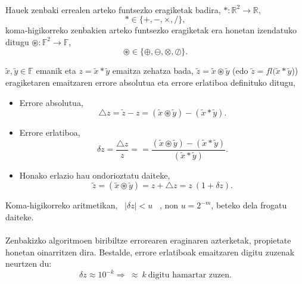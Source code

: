 \paragraph*{} Hauek zenbaki errealen arteko funtsezko eragiketak badira,  $\ast: \mathbb{R}^2\rightarrow \mathbb{R}$, 
\begin{equation*}
\ast\in \{+,-,\times,/ \},
\end{equation*}
koma-higikorreko zenbakien arteko funtsezko eragiketak era honetan izendatuko ditugu  $\circledast: \mathbb{F}^2\rightarrow \mathbb{F}$,
\begin{equation*}
\circledast\in \{\oplus,\ominus,\otimes,\oslash \}.
\end{equation*}

$\tilde x,\tilde y \in \mathbb{F}$ emanik eta $z= \tilde x \ast \tilde y$ emaitza zehatza bada, $\tilde z= \tilde x \circledast \tilde y$ (edo $\tilde z= fl(\tilde x \ast \tilde y$)) eragiketaren emaitzaren errore absolutua eta errore erlatiboa definituko ditugu,

\begin{itemize}
\item Errore absolutua,
\begin{equation*}
\triangle z=\tilde z-z =(\tilde x \circledast \tilde y) -(\tilde x \ast \tilde y).
\end{equation*} 
\item Errore erlatiboa,
\begin{equation*}
\delta z=\frac{\triangle z}{z}==\frac{(\tilde x \circledast \tilde y) -(\tilde x \ast \tilde y)}{(\tilde x \ast \tilde y)}.
\end{equation*} 
\item Honako erlazio hau ondorioztatu daiteke,
\begin{equation*}
\tilde z=(\tilde x \circledast \tilde y)=z+\triangle z=z \ (1+\delta z).  
\end{equation*}
\end{itemize}

Koma-higikorreko aritmetikan, \ $|\delta z|<u$ \ , non  $u=2^{-m}$, beteko dela frogatu daiteke.

\paragraph*{} Zenbakizko algoritmoen biribiltze errorearen eraginaren azterketak, propietate honetan oinarritzen dira. Bestalde, errore erlatiboak emaitzaren digitu zuzenak neurtzen du:
\begin{equation*}
\delta z \approx 10^{-k} \Rightarrow \ \approx \ k \ \mbox{digitu hamartar zuzen}.
\end{equation*}  


